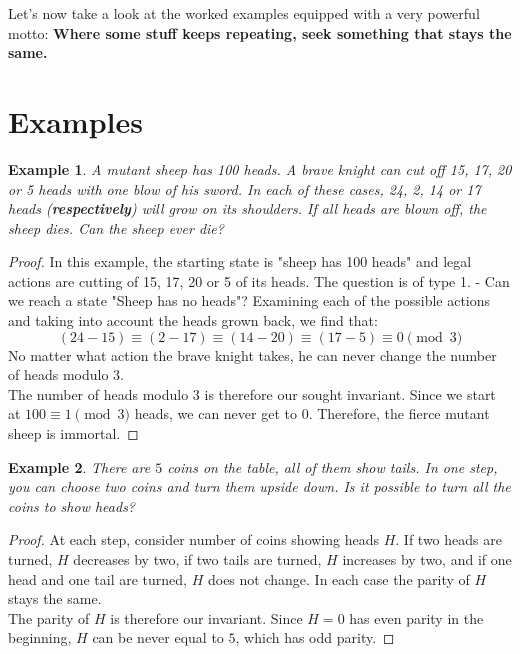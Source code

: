 \documentclass[11pt,a5paper]{article}
\newtheorem{theorem}{Example}
\begin{document}
\noindent Let's now take a look at the worked examples equipped with a very powerful motto: \textbf{Where some stuff keeps repeating, seek something that stays the same.}

\section{Examples}
\begin{theorem}
	A mutant sheep has 100 heads. A brave knight can cut off 15, 17, 20 or 5 heads with one blow of his sword. In each of these cases, 24, 2, 14 or 17 heads (\textbf{respectively}) will grow on its shoulders. If all heads are blown off, the sheep dies. Can the sheep ever die?
\end{theorem}
\begin{proof}
	In this example, the starting state is "sheep has 100 heads" and legal actions are cutting of 15, 17, 20 or 5 of its heads. The question is of type 1. - Can we reach a state "Sheep has no heads"?
	Examining each of the possible actions and taking into account the heads grown back, we find that:
	\[(24 - 15) \equiv (2 - 17) \equiv (14 - 20) \equiv (17 - 5) \equiv 0 \pmod 3\]
No matter what action the brave knight takes, he can never change the number of heads modulo $3$. \\
The number of heads modulo $3$ is therefore our sought invariant. Since we start at $100 \equiv 1 \pmod 3$ heads, we can never get to $0$. Therefore, the fierce mutant sheep is immortal.
\end{proof}

\begin{theorem}
	There are $5$ coins on the table, all of them show tails. In one step, you can choose two coins and turn them upside down. Is it possible to turn all the coins to show heads?
\end{theorem}	
\begin{proof}
At each step, consider number of coins showing heads $H$. If two heads are turned, $H$ decreases by two, if two tails are turned, $H$ increases by two, and if one head and one tail are turned, $H$ does not change. In each case the parity of $H$ stays the same. \\
The parity of $H$ is therefore our invariant. Since $H = 0$ has even parity in the beginning, $H$ can be never equal to $5$, which has odd parity.
\end{proof}
\end{document}

